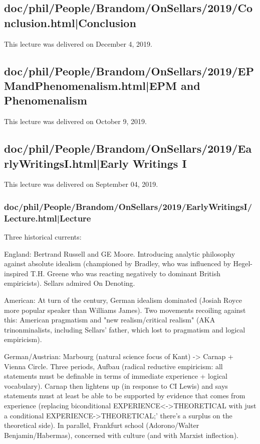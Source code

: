 \documentclass[12pt,a4paper]{report}
\begin{document}
\subsection{doc/phil/People/Brandom/OnSellars/2019/Conclusion.html|Conclusion}
This lecture was delivered on December 4, 2019.

\subsection{doc/phil/People/Brandom/OnSellars/2019/EPMandPhenomenalism.html|EPM and Phenomenalism}
This lecture was delivered on October 9, 2019.

\subsection{doc/phil/People/Brandom/OnSellars/2019/EarlyWritingsI.html|Early Writings I}
This lecture was delivered on September 04, 2019.

\subsubsection{doc/phil/People/Brandom/OnSellars/2019/EarlyWritingsI/Lecture.html|Lecture}

Three historical currents:

England: Bertrand Russell and GE Moore. Introducing analytic philosophy against absolute idealism (championed by Bradley, who was influenced by Hegel-inspired T.H. Greene who was reacting negatively to dominant British empiricists). Sellars admired On Denoting.

American: At turn of the century, German idealism dominated (Josiah Royce more popular speaker than Williams James). Two movements recoiling against this: American pragmatism and "new realism/critical realism" (AKA trinonminalists, including Sellars' father, which lost to pragmatism and logical empiricism).

German/Austrian: Marbourg (natural science focus of Kant) -> Carnap + Vienna Circle. Three periods, Aufbau (radical reductive empiricism: all statements must be definable in terms of immediate experience + logical vocabulary). Carnap then lightens up (in response to CI Lewis) and says statements must at least be able to be supported by evidence that comes from experience (replacing biconditional EXPERIENCE<->THEORETICAL with just a conditional EXPERIENCE->THEORETICAL;' there's a surplus on the theoretical side).
In parallel, Frankfurt school (Adorono/Walter Benjamin/Habermas), concerned with culture (and with Marxist inflection).
\end{document}
